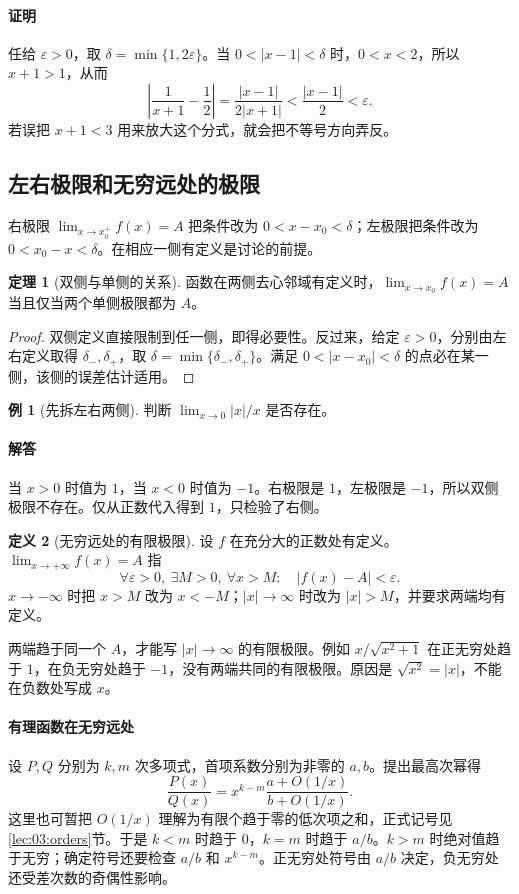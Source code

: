 \documentclass[UTF8,fontset=fandol,12pt,oneside,openany]{ctexrep}
\theoremstyle{definition}
\newtheorem{theorem}{定理}[chapter]
\newtheorem{definition}[theorem]{定义}
\newtheorem{example}{例}[chapter]
\begin{document}
\paragraph{证明}任给 $\varepsilon>0$，取 $\delta=\min\{1,2\varepsilon\}$。当 $0<|x-1|<\delta$ 时，$0<x<2$，所以 $x+1>1$，从而
\[
\left|\frac1{x+1}-\frac12\right|
=\frac{|x-1|}{2|x+1|}<\frac{|x-1|}{2}<\varepsilon.
\]
若误把 $x+1<3$ 用来放大这个分式，就会把不等号方向弄反。

\subsection{左右极限和无穷远处的极限}
右极限 $\lim_{x\to x_0^+}f(x)=A$ 把条件改为 $0<x-x_0<\delta$；左极限把条件改为 $0<x_0-x<\delta$。在相应一侧有定义是讨论的前提。

\begin{theorem}[双侧与单侧的关系]
函数在两侧去心邻域有定义时，$\lim_{x\to x_0}f(x)=A$ 当且仅当两个单侧极限都为 $A$。
\end{theorem}
\begin{proof}
双侧定义直接限制到任一侧，即得必要性。反过来，给定 $\varepsilon>0$，分别由左右定义取得 $\delta_-,\delta_+$，取 $\delta=\min\{\delta_-,\delta_+\}$。满足 $0<|x-x_0|<\delta$ 的点必在某一侧，该侧的误差估计适用。
\end{proof}

\begin{example}[先拆左右两侧]
判断 $\lim_{x\to0}|x|/x$ 是否存在。
\end{example}
\paragraph{解答}当 $x>0$ 时值为 $1$，当 $x<0$ 时值为 $-1$。右极限是 $1$，左极限是 $-1$，所以双侧极限不存在。仅从正数代入得到 $1$，只检验了右侧。

\begin{definition}[无穷远处的有限极限]
设 $f$ 在充分大的正数处有定义。$\lim_{x\to+\infty}f(x)=A$ 指
\[
\forall\varepsilon>0,\ \exists M>0,\ \forall x>M:
\quad |f(x)-A|<\varepsilon.
\]
$x\to-\infty$ 时把 $x>M$ 改为 $x<-M$；$|x|\to\infty$ 时改为 $|x|>M$，并要求两端均有定义。
\end{definition}
两端趋于同一个 $A$，才能写 $|x|\to\infty$ 的有限极限。例如 $x/\sqrt{x^2+1}$ 在正无穷处趋于 $1$，在负无穷处趋于 $-1$，没有两端共同的有限极限。原因是 $\sqrt{x^2}=|x|$，不能在负数处写成 $x$。

\paragraph{有理函数在无穷远处}
设 $P,Q$ 分别为 $k,m$ 次多项式，首项系数分别为非零的 $a,b$。提出最高次幂得
\[
\frac{P(x)}{Q(x)}
=x^{k-m}\frac{a+O(1/x)}{b+O(1/x)}.
\]
这里也可暂把 $O(1/x)$ 理解为有限个趋于零的低次项之和，正式记号见\ref{lec:03:orders}节。于是 $k<m$ 时趋于 $0$，$k=m$ 时趋于 $a/b$。$k>m$ 时绝对值趋于无穷；确定符号还要检查 $a/b$ 和 $x^{k-m}$。正无穷处符号由 $a/b$ 决定，负无穷处还受差次数的奇偶性影响。
\end{document}
